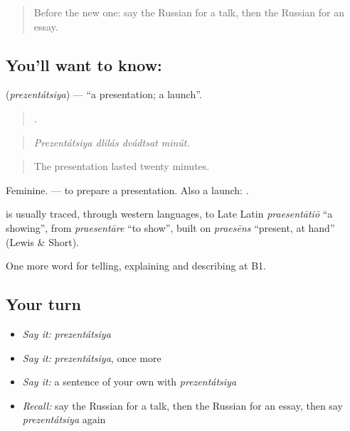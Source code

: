 \label{lesson:RU-C386-prezentaciya}



\begin{quote}
Before the new one: say the Russian for a talk, then the Russian for an essay.
\end{quote}

\subsection*{You'll want to know: }
\textbf{} (\emph{prezentátsiya}) — \textquotedblleft{}a presentation; a launch\textquotedblright{}.

\begin{quote}
   .
\end{quote}

\begin{quote}
\emph{Prezentátsiya dlilás dvádtsat minút.}
\end{quote}

\begin{quote}
The presentation lasted twenty minutes.
\end{quote}

Feminine. \emph{ } — to prepare a presentation. Also a launch: \emph{ }.

\begin{cousinweb}
\textbf{} is usually traced, through western languages, to Late Latin \emph{praesentātiō} \textquotedblleft{}a showing\textquotedblright{}, from \emph{praesentāre} \textquotedblleft{}to show\textquotedblright{}, built on \emph{praesēns} \textquotedblleft{}present, at hand\textquotedblright{} (Lewis \& Short).
\end{cousinweb}

\begin{grammarlens}[title={What you've built}]
One more word for telling, explaining and describing at B1.
\end{grammarlens}

\subsection*{Your turn}
\begin{itemize}
\raggedright
  \item \emph{Say it:} \emph{prezentátsiya}
  \item \emph{Say it:} \emph{prezentátsiya}, once more
  \item \emph{Say it:} a sentence of your own with \emph{prezentátsiya}
  \item \emph{Recall:} say the Russian for a talk, then the Russian for an essay, then say \emph{prezentátsiya} again
\end{itemize}


